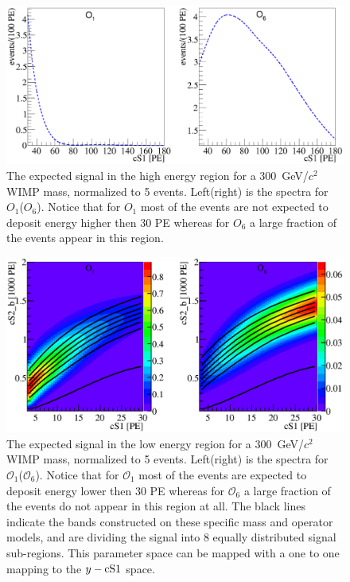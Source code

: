 \begin{figure}[h!]
\begin{minipage}{1.\linewidth}
\centerline{\includegraphics[width=1.\linewidth]{Figures/SigHighO1O6.eps}}
\end{minipage}
\caption{The expected signal in the high energy region for a 300~GeV/$c^2$ WIMP mass, normalized to 5 events. Left(right) is the spectra for $O_1$($O_6$). Notice that for $O_1$ most of the events are not expected to deposit energy higher then 30 PE whereas for $O_6$ a large fraction of the events appear in this region.}
\label{fig:HighE}
\end{figure} 

\begin{figure}[h!]
\begin{minipage}{1.\linewidth}
\centerline{\includegraphics[width=1.\linewidth]{Figures/SigLowO1O6.eps}}
\end{minipage}
\caption{The expected signal in the low energy region for a 300~GeV/$c^2$ WIMP mass, normalized to 5 events. Left(right) is the spectra for $\mathcal{O}_1$($\mathcal{O}_6$). Notice that for $\mathcal{O}_1$ most of the events are expected to deposit energy lower then 30 PE whereas for $\mathcal{O}_6$ a large fraction of the events do not appear in this region at all. The black lines indicate the bands constructed on these specific mass and operator models, and are dividing the signal into 8 equally distributed signal sub-regions. This parameter space can be mapped with a one to one mapping to the $y-\mathrm{cS1}$ space.}
\label{fig:LowE}
\end{figure}




